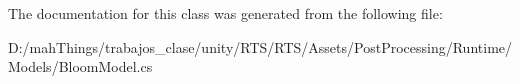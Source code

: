 The documentation for this class was generated from the following file\+:\begin{DoxyCompactItemize}
\item 
D\+:/mah\+Things/trabajos\+\_\+clase/unity/\+R\+T\+S/\+R\+T\+S/\+Assets/\+Post\+Processing/\+Runtime/\+Models/Bloom\+Model.\+cs\end{DoxyCompactItemize}
